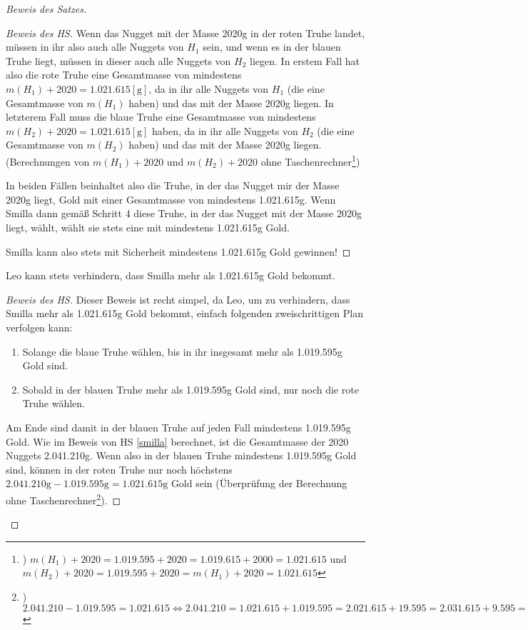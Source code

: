 \begin{proof}[Beweis des Satzes]
\begin{proof}[Beweis des HS]
        Wenn das Nugget mit der Masse 2020g in der roten Truhe landet, müssen in ihr also auch alle Nuggets von $H_1$ 
        sein, und wenn es in der blauen Truhe liegt, müssen in dieser auch alle Nuggets von $H_2$ liegen. In erstem 
        Fall hat also die rote Truhe eine Gesamtmasse von mindestens $m(H_1)+2020=1.021.615 [\text{g}]$, da in ihr 
        alle Nuggets von $H_1$ (die eine Gesamtmasse von $m(H_1)$ haben) und das mit der Masse 2020g liegen. In 
        letzterem Fall muss die blaue Truhe eine Gesamtmasse von mindestens $m(H_2)+2020=1.021.615 [\text{g}]$ haben,
        da in ihr alle Nuggets von $H_2$ (die eine Gesamtmasse von $m(H_2)$ haben) und das mit der Masse 2020g 
        liegen. (Berechnungen von $m(H_1)+2020$ und $m(H_2)+2020$ ohne Taschenrechner\footnote{) $m(H_1)+2020=
        1.019.595+2020=1.019.615+2000=1.021.615$ und $m(H_2)+2020=1.019.595+2020=m(H_1)+2020=1.021.615$})

        In beiden Fällen beinhaltet also die Truhe, in der das Nugget mir der Masse 2020g liegt, Gold mit einer 
        Gesamtmasse von mindestens 1.021.615g. Wenn Smilla dann gemäß Schritt 4 diese Truhe, in der das Nugget mit 
        der Masse 2020g liegt, wählt, wählt sie stets eine mit mindestens 1.021.615g Gold.

        Smilla kann also stets mit Sicherheit mindestens 1.021.615g Gold gewinnen!
    \end{proof}
    \begin{lem}\label{leo}
        Leo kann stets verhindern, dass Smilla mehr als 1.021.615g Gold bekommt.
    \end{lem}
    \begin{proof}[Beweis des HS]
        Dieser Beweis ist recht simpel, da Leo, um zu verhindern, dass Smilla mehr als 1.021.615g Gold bekommt, 
        einfach folgenden zweischrittigen Plan verfolgen kann:
        \begin{enumerate}
            \item Solange die blaue Truhe wählen, bis in ihr insgesamt mehr als 1.019.595g Gold sind.
            \item Sobald in der blauen Truhe mehr als 1.019.595g Gold sind, nur noch die rote Truhe wählen.
        \end{enumerate}
        Am Ende sind damit in der blauen Truhe auf jeden Fall mindestens 1.019.595g Gold. Wie im Beweis von HS 
        \ref{smilla} berechnet, ist die Gesamtmasse der 2020 Nuggets 2.041.210g. Wenn also in der blauen Truhe 
        mindestens 1.019.595g Gold sind, können in der roten Truhe nur noch höchstens $2.041.210\text{g}-1.019.595
        \text{g}=1.021.615\text{g}$ Gold sein (Überprüfung der Berechnung ohne Taschenrechner\footnote{) $2.041.210-
        1.019.595=1.021.615\Leftrightarrow 2.041.210=1.021.615+1.019.595=2.021.615+19.595=2.031.615+9.595=2.040.615
        +595=2.041.115+95=2.041.210$}).


\end{proof}
\end{proof}
